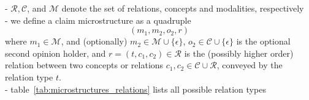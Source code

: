 \noindent - $\mathcal{R}, \mathcal{C}$, and $\mathcal{M}$ denote the set of relations, concepts and
modalities, respectively \\
- we define a claim microstructure as a quadruple 
$$
(m_1, m_2, o_2, r)
$$ 
where $m_1 \in \mathcal{M}$, and (optionally) $m_2 \in \mathcal{M} \cup \{\epsilon\}$,
$o_2 \in \mathcal{C} \cup \{\epsilon\}$ is the optional second opinion holder, and 
$r = (t, c_1, c_2) \in \mathcal{R}$ is the (possibly higher order) relation 
between two concepts or relations $c_1, c_2 \in \mathcal{C} \cup \mathcal{R}$, 
conveyed by the relation type $t$. \\
- table~\ref{tab:microstructures_relations} lists all possible relation types \\
